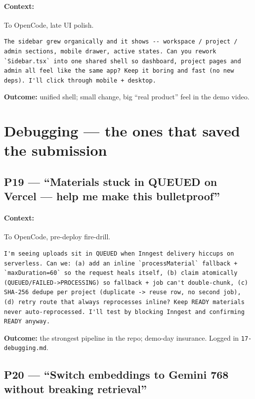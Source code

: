 \documentclass[11pt,a4paper]{article}
\begin{document}
\paragraph{Context:} To OpenCode, late UI polish.
\begin{lstlisting}
The sidebar grew organically and it shows -- workspace / project / admin sections, mobile drawer, active states. Can you rework `Sidebar.tsx` into one shared shell so dashboard, project pages and admin all feel like the same app? Keep it boring and fast (no new deps). I'll click through mobile + desktop.
\end{lstlisting}
\textbf{Outcome:} unified shell; small change, big ``real product'' feel in the demo video.

\section{Debugging --- the ones that saved the submission}

\subsection{P19 --- ``Materials stuck in QUEUED on Vercel --- help me make this bulletproof''}
\paragraph{Context:} To OpenCode, pre-deploy fire-drill.
\begin{lstlisting}
I'm seeing uploads sit in QUEUED when Inngest delivery hiccups on serverless. Can we: (a) add an inline `processMaterial` fallback + `maxDuration=60` so the request heals itself, (b) claim atomically (QUEUED/FAILED->PROCESSING) so fallback + job can't double-chunk, (c) SHA-256 dedupe per project (duplicate -> reuse row, no second job), (d) retry route that always reprocesses inline? Keep READY materials never auto-reprocessed. I'll test by blocking Inngest and confirming READY anyway.
\end{lstlisting}
\textbf{Outcome:} the strongest pipeline in the repo; demo-day insurance. Logged in \texttt{17-debugging.md}.

\subsection{P20 --- ``Switch embeddings to Gemini 768 without breaking retrieval''}
\end{document}
